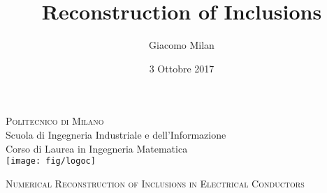 \documentclass[10pt]{beamer}
\title{Reconstruction of Inclusions}
\author{Giacomo Milan}
\date{3 Ottobre 2017}
\theoremstyle{plain}
\theoremstyle{plain}
\begin{document}
\begin{frame}
    \begin{center}
        \normalsize
        \textsc{Politecnico di Milano}\\
        Scuola di Ingegneria Industriale e dell'Informazione\\
        Corso di Laurea in Ingegneria Matematica\\
        \vspace{0.7cm}
        \texttt{[image: fig/logoc]}
        

        \vspace{0.4cm}
        \Large
        \textsc{Numerical Reconstruction of Inclusions in Electrical Conductors}
        
        \vspace{0.3cm}
        
    \end{center}

\end{frame}
\end{document}
